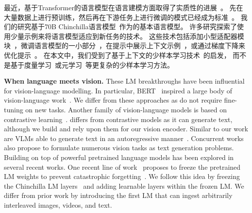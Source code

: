 最近，基于Transformer的语言模型在语言建模方面取得了实质性的进展~\citep{vaswani2017attention}。
先在大量数据上进行预训练，然后再在下游任务上进行微调的模式已经成为标准~\citep{mikolov2010recurrent,graves2013generating,jozefowicz2016exploring,howard2018universal,bert,t5,sutskever2011generating,gpt3}。
我们的研究基于70B Chinchilla语言模型~\citep{chinchilla}作为\largem{}的基本语言模型。 
许多研究探索了使用少量示例来将语言模型适应到新任务的技术。 这些技术包括添加小型适配器模块~\citep{houlsby2019parameter}，微调语言模型的一小部分~\citep{zaken_bitfit_2022}，在提示中展示上下文示例~\citep{gpt3}，或通过梯度下降来优化提示~\citep{li2021prefix,lester2021power}。 在本文中，我们受到了基于上下文的少样本学习技术~\citep{gpt3}的启发，
而不是基于度量学习~\citep{doersch2020crosstransformers,vinyals2016matching,snell2017prototypical,tian2020rethinking}或元学习~\citep{finn2017model,bertinetto2018meta,zintgraf2019fast,requeima2019fast,gordon2018meta,bertinetto2016learning}等更复杂的少样本学习方法。

\textbf{When language meets vision.}
These LM breakthroughs have been influential for vision-language modelling.
In particular, BERT~\citep{bert} inspired a large body of vision-language work~\citep{lu2019vilbert,su2019vl,chen2020uniter,hendricks2021decoupling,wang2021vlmo,li2020oscar,tan2019lxmert,zhu2020actbert,wang2021ufo,li2020hero,gan2020large,fu2021violet,zellers2021merlot,zellers2022merlot,singh2021flava,sun2019videobert}.
We differ from these approaches as \methodfamily{} do not require fine-tuning on new tasks.
Another family of vision-language models is based on contrastive learning~\citep{alayrac2020self,clip,align,zhai2021lit,pham2021combined,miech2020end,bain2021frozen,yuan2021florence,li2021align,yao2021filip,jain2021mural}.
\method{} differs from contrastive models as it can generate text,
although we build and rely upon them for our vision encoder.
Similar to our work are VLMs able to generate text in an autoregressive manner~\citep{vinyals2015show,donahue2015long,luo2020univl,hu2021scaling,dai2022}.
Concurrent works~\citep{wang2021simvlm,cho2021unifying,wang2022unifying,zhu2021uni,li2022blip} also propose to formulate numerous vision tasks as text generation problems.
Building on top of powerful pretrained language models has been explored in several recent works.
One recent line of work~\citep{tsimpoukelli2021multimodal,eichenberg2021magma,mokady2021clipcap,luo2022vc,yang2021empirical,zeng2022socraticmodels} proposes to freeze the pretrained LM weights to prevent catastrophic forgetting~\citep{mccloskey1989catastrophic}.
We follow this idea by freezing the Chinchilla LM layers~\citep{chinchilla} and adding learnable layers within the frozen LM.
We differ from prior work by introducing the first LM that can ingest arbitrarily interleaved images, videos, and text.

